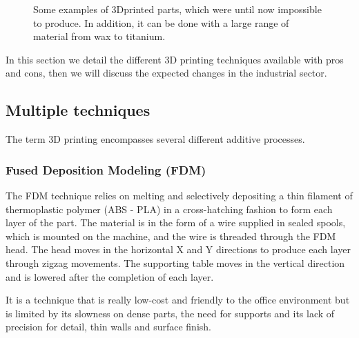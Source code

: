 \begin{figure}[!b]
\centering
    \hfil
    \hfil
    \caption{Some examples of 3Dprinted parts, which were until now impossible to produce. In addition, it can be done with a large range of material from wax to titanium.}
    \label{fig:3D_printed_objects}
\end{figure}

In this section we detail the different 3D printing techniques available with pros and cons, then we will discuss the expected changes in the industrial sector.

\subsection{Multiple techniques} %

The term 3D printing encompasses several different additive processes.

\subsubsection{Fused Deposition Modeling (FDM)} %

The FDM technique relies on melting and selectively depositing a thin filament of thermoplastic polymer (ABS - PLA) in a cross-hatching fashion to form each layer of the part. The material is in the form of a wire supplied in sealed spools, which is mounted on the machine, and the wire is threaded through the FDM head. The head moves in the horizontal X and Y directions  to produce each layer through zigzag movements. The supporting table moves in the vertical direction and is lowered after the completion of each layer.

\begin{figure}[h]
    \centering
        \hfil
        \hfil
    \caption{}
    \label{fig:FDM_technique}
\end{figure}

It is a technique that is really low-cost and friendly to the office environment but is limited by its slowness on dense parts, the need for supports and its lack of precision for detail, thin walls and surface finish.


